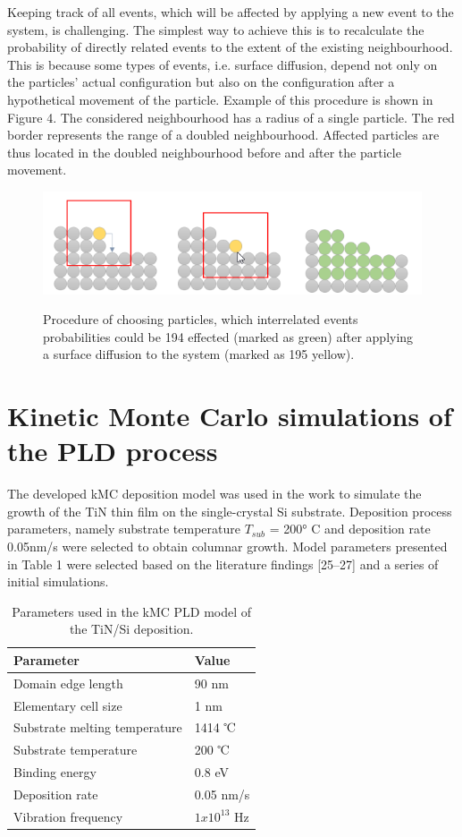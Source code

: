 \documentclass[journal,article,submit,pdftex,moreauthors]{Definitions/mdpi}
\begin{document}
     Keeping track of all events, which will be affected by applying a new event to the system, is challenging. The simplest way to achieve this is to recalculate the probability of directly related events to the extent of the existing neighbourhood. This is because some types of events, i.e. surface diffusion, depend not only on the particles’ actual configuration but also on the configuration after a hypothetical movement of the particle. Example of this procedure is shown in Figure 4. The considered neighbourhood has a radius of a single particle. The red border represents the range of a doubled neighbourhood. Affected particles are thus located in the doubled neighbourhood before and after the particle movement.
    \begin{figure}[H]
    \captionsetup{justification=centering}
    \centering
    \includegraphics{Definitions/picture4.png}
    \label{fig:obraz3}
    \caption{Procedure of choosing particles, which interrelated events probabilities could be 194
effected (marked as green) after applying a surface  diffusion to the system (marked as 195
yellow).}
    \end{figure}
\section{Kinetic Monte Carlo simulations of the PLD process}
 
The developed kMC deposition model was used in the work to simulate the growth of the TiN thin film on the single-crystal Si substrate. Deposition process parameters, namely substrate temperature \(T_{sub}\) = 200° C and deposition rate 0.05nm/s were selected to obtain columnar growth. Model parameters presented in Table 1 were selected based on the literature findings [25–27] and a series of initial simulations. 
 
\begin{table}[H] 
\centering
\captionsetup{justification=centering}
\caption{Parameters used in the kMC PLD model of the TiN/Si deposition.\label{tab1}}
\begin{tabularx}{0.7\textwidth}{CC}
\toprule
Parameter	& Value\\
\midrule
Domain edge length &90 nm\\
Elementary cell size &1 nm\\
Substrate melting temperature &1414 ℃\\
Substrate temperature &200 ℃\\
Binding energy	&0.8 eV\\
Deposition rate &0.05 nm/s\\
Vibration frequency &\(1x10^{13}\) Hz\\
\bottomrule
\end{tabularx}
\end{table}
 
\end{document}
